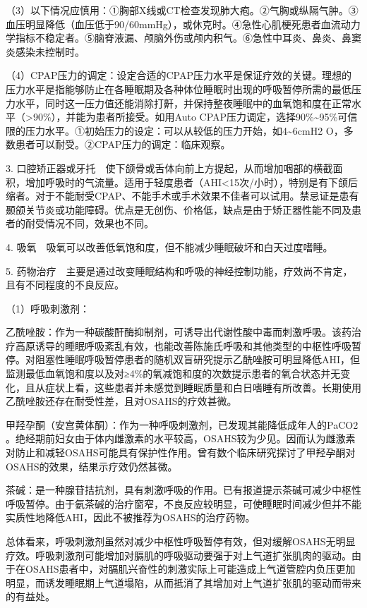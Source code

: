 （3）以下情况应慎用：①胸部X线或CT检查发现肺大疱。②气胸或纵隔气肿。③血压明显降低（血压低于90/60mmHg），或休克时。④急性心肌梗死患者血流动力学指标不稳定者。⑤脑脊液漏、颅脑外伤或颅内积气。⑥急性中耳炎、鼻炎、鼻窦炎感染未控制时。

（4）CPAP压力的调定：设定合适的CPAP压力水平是保证疗效的关键。理想的压力水平是指能够防止在各睡眠期及各种体位睡眠时出现的呼吸暂停所需的最低压力水平，同时这一压力值还能消除打鼾，并保持整夜睡眠中的血氧饱和度在正常水平（\textgreater{}90\%），并能为患者所接受。如用Auto
CPAP压力调定，选择90\%\textasciitilde{}95\%可信限的压力水平。①初始压力的设定：可以从较低的压力开始，如4\textasciitilde{}6cmH{2}
O，多数患者可以耐受。②CPAP压力的调定：临床观察。

3.
口腔矫正器或牙托　使下颌骨或舌体向前上方提起，从而增加咽部的横截面积，增加呼吸时的气流量。适用于轻度患者（AHI\textless{}15次/小时），特别是有下颌后缩者。对于不能耐受CPAP、不能手术或手术效果不佳者可以试用。禁忌证是患有颞颌关节炎或功能障碍。优点是无创伤、价格低，缺点是由于矫正器性能不同及患者的耐受情况不同，效果也不同。

4. 吸氧　吸氧可以改善低氧饱和度，但不能减少睡眠破坏和白天过度嗜睡。

5.
药物治疗　主要是通过改变睡眠结构和呼吸的神经控制功能，疗效尚不肯定，且有不同程度的不良反应。

（1）呼吸刺激剂：

乙酰唑胺：作为一种碳酸酐酶抑制剂，可诱导出代谢性酸中毒而刺激呼吸。该药治疗高原诱导的睡眠呼吸紊乱有效，也能改善陈施氏呼吸和其他类型的中枢性呼吸暂停。对阻塞性睡眠呼吸暂停患者的随机双盲研究提示乙酰唑胺可明显降低AHI，但监测最低血氧饱和度以及对≥4\%的氧减饱和度的次数提示患者的氧合状态并无变化，且从症状上看，这些患者并未感觉到睡眠质量和白日嗜睡有所改善。长期使用乙酰唑胺还存在耐受性差，且对OSAHS的疗效甚微。

甲羟孕酮（安宫黄体酮）：作为一种呼吸刺激剂，已发现其能降低成年人的PaCO{2}
。绝经期前妇女由于体内雌激素的水平较高，OSAHS较为少见。因而认为雌激素对防止和减轻OSAHS可能具有保护性作用。曾有数个临床研究探讨了甲羟孕酮对OSAHS的效果，结果示疗效仍然甚微。

茶碱：是一种腺苷拮抗剂，具有刺激呼吸的作用。已有报道提示茶碱可减少中枢性呼吸暂停。由于氨茶碱的治疗窗窄，不良反应较明显，可使睡眠时间减少但并不能实质性地降低AHI，因此不被推荐为OSAHS的治疗药物。

总体看来，呼吸刺激剂虽然对减少中枢性呼吸暂停有效，但对缓解OSAHS无明显疗效。呼吸刺激剂可能增加对膈肌的呼吸驱动要强于对上气道扩张肌肉的驱动。由于在OSAHS患者中，对膈肌兴奋性的刺激实际上可能造成上气道管腔内负压更加明显，而诱发睡眠期上气道塌陷，从而抵消了其增加对上气道扩张肌的驱动而带来的有益处。

